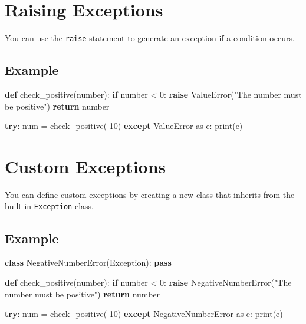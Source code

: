 \documentclass[
  letterpaper,
  DIV=11,
  numbers=noendperiod]{scrreprt}
\newenvironment{Shaded}{\begin{snugshade}}{\end{snugshade}}
\newcommand{\BuiltInTok}[1]{\textcolor[rgb]{0.00,0.23,0.31}{#1}}
\newcommand{\ControlFlowTok}[1]{\textcolor[rgb]{0.00,0.23,0.31}{\textbf{#1}}}
\newcommand{\DecValTok}[1]{\textcolor[rgb]{0.68,0.00,0.00}{#1}}
\newcommand{\ImportTok}[1]{\textcolor[rgb]{0.00,0.46,0.62}{#1}}
\newcommand{\KeywordTok}[1]{\textcolor[rgb]{0.00,0.23,0.31}{\textbf{#1}}}
\newcommand{\NormalTok}[1]{\textcolor[rgb]{0.00,0.23,0.31}{#1}}
\newcommand{\OperatorTok}[1]{\textcolor[rgb]{0.37,0.37,0.37}{#1}}
\newcommand{\PreprocessorTok}[1]{\textcolor[rgb]{0.68,0.00,0.00}{#1}}
\newcommand{\StringTok}[1]{\textcolor[rgb]{0.13,0.47,0.30}{#1}}
\begin{document}
\section{Raising Exceptions}\label{raising-exceptions}

You can use the \texttt{raise} statement to generate an exception if a
condition occurs.

\subsection{Example}\label{example-4}

\begin{Shaded}
\begin{Highlighting}[]
\KeywordTok{def}\NormalTok{ check\_positive(number):}
    \ControlFlowTok{if}\NormalTok{ number }\OperatorTok{\textless{}} \DecValTok{0}\NormalTok{:}
        \ControlFlowTok{raise} \PreprocessorTok{ValueError}\NormalTok{(}\StringTok{"The number must be positive"}\NormalTok{)}
    \ControlFlowTok{return}\NormalTok{ number}

\ControlFlowTok{try}\NormalTok{:}
\NormalTok{    num }\OperatorTok{=}\NormalTok{ check\_positive(}\OperatorTok{{-}}\DecValTok{10}\NormalTok{)}
\ControlFlowTok{except} \PreprocessorTok{ValueError} \ImportTok{as}\NormalTok{ e:}
    \BuiltInTok{print}\NormalTok{(e)}
\end{Highlighting}
\end{Shaded}

\section{Custom Exceptions}\label{custom-exceptions}

You can define custom exceptions by creating a new class that inherits
from the built-in \texttt{Exception} class.

\subsection{Example}\label{example-5}

\begin{Shaded}
\begin{Highlighting}[]
\KeywordTok{class}\NormalTok{ NegativeNumberError(}\PreprocessorTok{Exception}\NormalTok{):}
    \ControlFlowTok{pass}

\KeywordTok{def}\NormalTok{ check\_positive(number):}
    \ControlFlowTok{if}\NormalTok{ number }\OperatorTok{\textless{}} \DecValTok{0}\NormalTok{:}
        \ControlFlowTok{raise}\NormalTok{ NegativeNumberError(}\StringTok{"The number must be positive"}\NormalTok{)}
    \ControlFlowTok{return}\NormalTok{ number}

\ControlFlowTok{try}\NormalTok{:}
\NormalTok{    num }\OperatorTok{=}\NormalTok{ check\_positive(}\OperatorTok{{-}}\DecValTok{10}\NormalTok{)}
\ControlFlowTok{except}\NormalTok{ NegativeNumberError }\ImportTok{as}\NormalTok{ e:}
    \BuiltInTok{print}\NormalTok{(e)}
\end{Highlighting}
\end{Shaded}
\end{document}
